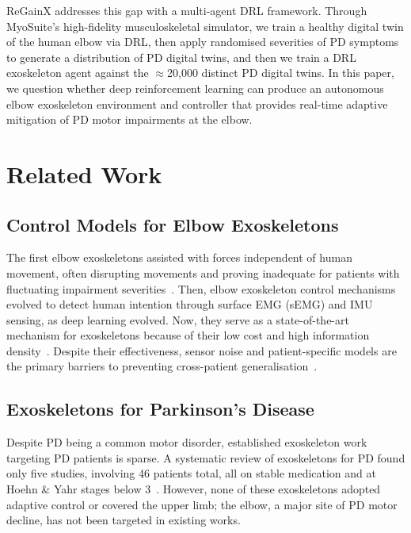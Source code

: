 \documentclass[letterpaper]{article} %
\begin{document}
ReGainX addresses this gap with a multi-agent DRL framework.
Through MyoSuite's high-fidelity musculoskeletal simulator, we train a healthy
digital twin of the human elbow via DRL, then apply randomised severities of PD
symptoms to generate a distribution of PD digital twins, and then we train a DRL
exoskeleton agent against the $\approx$20,000 distinct PD digital twins.
In this paper, we question whether deep reinforcement learning can produce an
autonomous elbow exoskeleton environment and controller that provides real-time
adaptive mitigation of PD motor impairments at the elbow.

\section{Related Work}
\label{sec:related}

\subsection{Control Models for Elbow Exoskeletons}

The first elbow exoskeletons assisted with forces independent of human movement,
often disrupting movements and proving inadequate for patients with fluctuating
impairment severities~\citep{gasperina2021}.
Then, elbow exoskeleton control mechanisms evolved to detect human intention
through surface EMG (sEMG) and IMU sensing, as deep learning evolved.
Now, they serve as a state-of-the-art mechanism for exoskeletons because of
their low cost and high information density~\citep{supriyono2025}.
Despite their effectiveness, sensor noise and patient-specific models are the
primary barriers to preventing cross-patient
generalisation~\citep{supriyono2025}.

\subsection{Exoskeletons for Parkinson's Disease}

Despite PD being a common motor disorder, established exoskeleton work targeting
PD patients is sparse.
A systematic review of exoskeletons for PD found only five studies, involving
46 patients total, all on stable medication and at Hoehn \& Yahr stages below
3~\citep{fortunati2024}.
However, none of these exoskeletons adopted adaptive control or covered the
upper limb; the elbow, a major site of PD motor decline, has not been targeted
in existing works.
\end{document}
